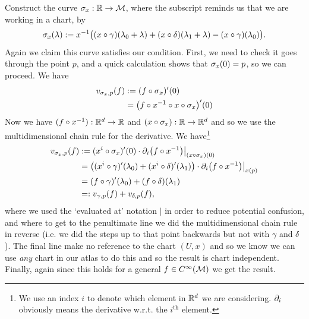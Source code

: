 \documentclass[12pt]{article} %
\begin{document}
        
        Construct the curve $\sigma_x:\mathbb{R}\to\mathcal{M}$, where the subscript reminds us that we are working in a chart, by 
        \begin{align*} 
            \sigma_x(\lambda) := x^{-1} \big( (x\circ \gamma)(\lambda_0+\lambda) + (x\circ\delta)(\lambda_1+\lambda) - (x\circ\gamma)(\lambda_0)\big).
        \end{align*} 
        Again we claim this curve satisfies our condition. First, we need to check it goes through the point $p$, and a quick calculation shows that $\sigma_x(0) = p$, so we can proceed. We have 
        \begin{align*} 
            \begin{split}
                v_{\sigma_x,p}(f) & := (f\circ \sigma_x)'(0) \\
                & = \big( f \circ x^{-1}\circ x \circ \sigma_x\big)'(0)
            \end{split}
        \end{align*} 
        Now we have $(f\circ x^{-1}):\mathbb{R}^d\to \mathbb{R}$ and $(x\circ\sigma_x):\mathbb{R}\to\mathbb{R}^d$ and so we use the multidimensional chain rule for the derivative. We have\footnote{We use an index $i$ to denote which element in $\mathbb{R}^d$ we are considering. $\partial_i$ obviously means the derivative w.r.t. the $i^{\text{th}}$ element.}
        \begin{align*} 
            \begin{split}
                 v_{\sigma_x,p}(f) & := (x^i\circ \sigma_x)'(0) \cdot \partial_i \big( f\circ x^{-1}\big)\big|_{(x\circ\sigma_x)(0)} \\
                 & = \big( (x^i\circ\gamma)'(\lambda_0) + (x^i\circ\delta)'(\lambda_1) \big)\cdot \partial_i \big(f\circ x^{-1}\big)\big|_{x(p)} \\
                 & = (f\circ \gamma)'(\lambda_0) + (f\circ\delta)(\lambda_1) \\
                 & =: v_{\gamma,p}(f)+ v_{\delta,p}(f),
            \end{split}
        \end{align*}
        where we used the `evaluated at' notation $|$ in order to reduce potential confusion, and where to get to the penultimate line we did the multidimensional chain rule in reverse (i.e. we did the steps up to that point backwards but not with $\gamma$ and $\delta$). The final line make no reference to the chart $(U,x)$ and so we know we can use \textit{any} chart in our atlas to do this and so the result is chart independent. Finally, again since this holds for a general $f\in C^{\infty}(\mathcal{M})$ we get the result. 
\end{document}

